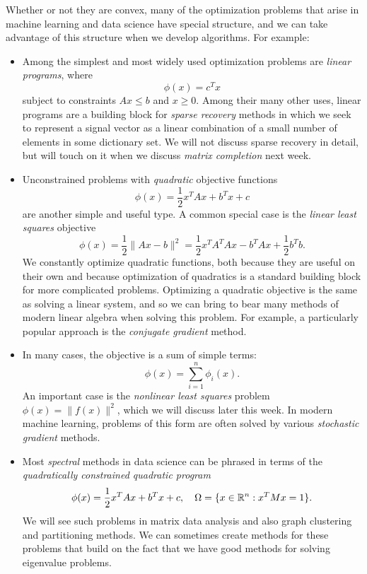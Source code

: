 \documentclass[12pt, leqno]{article} %
\begin{document}
Whether or not they are convex, many of the optimization problems that
arise in machine learning and data science have special structure,
and we can take advantage of this structure when we develop
algorithms.  For example:
\begin{itemize}
\item
  Among the simplest and most widely used optimization problems
  are {\em linear programs}, where
  \[
    \phi(x) = c^T x
  \]
  subject to constraints $Ax \leq b$ and $x \geq 0$.  Among their many
  other uses, linear programs are a building block for
  {\em sparse recovery} methods in which we seek to represent a signal
  vector as a linear combination of a small number of elements in some
  dictionary set.  We will not discuss sparse recovery in detail, but
  will touch on it when we discuss {\em matrix completion} next week.

\item
  Unconstrained problems with {\em quadratic} objective functions
  \[
    \phi(x) = \frac{1}{2} x^T A x + b^T x + c
  \]
  are another simple and useful type.  A common special case is the
  {\em linear least squares} objective
  \[
    \phi(x) = \frac{1}{2} \|Ax-b\|^2
    = \frac{1}{2} x^T A^T A x - b^T Ax + \frac{1}{2} b^T b.
  \]
  We constantly optimize quadratic functions, both because they are
  useful on their own and because optimization of quadratics is a
  standard building block for more complicated problems.  Optimizing
  a quadratic objective is the same as solving a linear system, and
  so we can bring to bear many methods of modern linear algebra when
  solving this problem.  For example, a particularly popular approach
  is the {\em conjugate gradient} method.

\item
  In many cases, the objective is a sum of simple terms:
  \[
    \phi(x) = \sum_{i=1}^n \phi_i(x).
  \]
  An important case is the {\em nonlinear least squares} problem
  $\phi(x) = \|f(x)\|^2$, which we will discuss later this week.
  In modern machine learning, problems of this form are often solved
  by various {\em stochastic gradient} methods.
  
\item
  Most {\em spectral} methods in data science can be phrased in
  terms of the {\em quadratically constrained quadratic program}
  \[
    \phi(x) = \frac{1}{2} x^T A x + b^T x + c, \quad
    \Omega = \{ x \in \mathbb{R}^n : x^T M x = 1 \}.
  \]
  We will see such problems in matrix data analysis and also graph
  clustering and partitioning methods.  We can sometimes create methods
  for these problems that build on the fact that we have good methods
  for solving eigenvalue problems.


\end{itemize}
\end{document}
